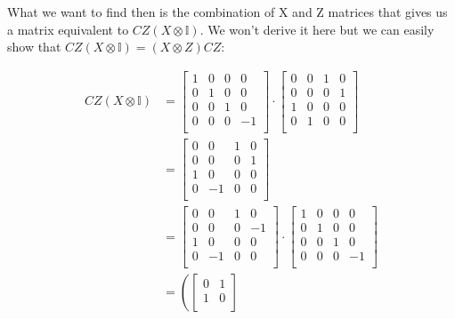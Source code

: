 What we want to find then is the combination of X and Z matrices that gives us a matrix equivalent to $CZ(X\otimes\mathbb{I})$. We won't derive it here but we can easily show that $CZ(X\otimes\mathbb{I}) = (X\otimes Z)CZ$:

\begin{align} \label{eqn_APP: CZ commute X}
    CZ(X\otimes\mathbb{I}) & = 
    \begin{bmatrix}
        1 & 0 & 0 & 0 \\
        0 & 1 & 0 & 0 \\
        0 & 0 & 1 & 0 \\
        0 & 0 & 0 & -1 \\
    \end{bmatrix} \cdot
    \begin{bmatrix}
        0 & 0 & 1 & 0 \\
        0 & 0 & 0 & 1 \\
        1 & 0 & 0 & 0 \\
        0 & 1 & 0 & 0 \\
    \end{bmatrix}
    \\ & =
    \begin{bmatrix}
        0 & 0 & 1 & 0 \\
        0 & 0 & 0 & 1 \\
        1 & 0 & 0 & 0 \\
        0 & -1 & 0 & 0 \\
    \end{bmatrix}
    \\ & = 
    \begin{bmatrix}
        0 & 0 & 1 & 0 \\
        0 & 0 & 0 & -1 \\
        1 & 0 & 0 & 0 \\
        0 & -1 & 0 & 0 \\
    \end{bmatrix} \cdot
    \begin{bmatrix}
        1 & 0 & 0 & 0 \\
        0 & 1 & 0 & 0 \\
        0 & 0 & 1 & 0 \\
        0 & 0 & 0 & -1 \\
    \end{bmatrix} 
    \\ & = 
    \left(
    \begin{bmatrix}
        0 & 1 \\
        1 & 0 \\

\end{bmatrix}
\end{align}
